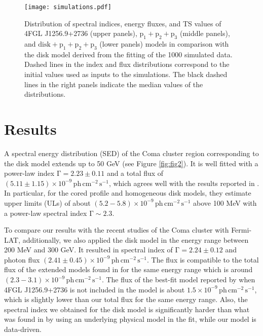 \documentclass[fleqn,usenatbib]{mnras}
\begin{document}
\begin{figure*}
 \centering
\texttt{[image: simulations.pdf]}
\caption{Distribution of spectral indices, energy fluxes, and TS values of 4FGL J1256.9+2736 (upper panels), $\mathrm{p_1+p_2+p_3}$ (middle panels), and $\mathrm{disk+p_1+p_2+p_3}$ (lower panels) models in comparison with the disk model derived from the fitting of the 1000 simulated data. Dashed lines in the index and flux distributions correspond to the initial values used as inputs to the simulations.  The black dashed lines in the right panels indicate the median values of the distributions.}
\label{fig:fig3}
\end{figure*}

\section{Results}

A spectral energy distribution (SED) of the Coma cluster region corresponding to the disk model extends up to 50 GeV (see Figure \ref{fig:fig2}). It is well fitted with a power-law index $\mathrm{\Gamma=2.23\pm0.11}$ and a total flux of $\mathrm{(5.11\pm1.15)\times10^{-9}\,ph\,cm^{-2}\,s^{-1}}$, which agrees well with the results reported in \citet{comaFermiCollab2016ApJ...819..149A}. In particular, for the cored profile and homogeneous disk models, they estimate upper limits (ULs) of about $\mathrm{(5.2-5.8)\times10^{-9}\,ph\,cm^{-2}\,s^{-1}}$ above 100 MeV with a power-law spectral index $\mathrm{\Gamma\sim2.3}$.

To compare our results with the recent studies of the Coma cluster with Fermi-LAT, additionally, we also applied the disk model in the energy range between 200 MeV and 300 GeV. It resulted in spectral index of $\mathrm{\Gamma=2.24\pm0.12}$ and photon flux $\mathrm{(2.41\pm0.45)\times10^{-9}\,ph\,cm^{-2}\,s^{-1}}$. The flux is compatible to the total flux of the extended models found in \citet{fermicoma2018PhRvD..98f3006X} for the same energy range which is around $\mathrm{(2.3-3.1)\times10^{-9}\,ph\,cm^{-2}\,s^{-1}}$. The flux of the best-fit model reported by \citet{2021A&A...648A..60A} when 4FGL J1256.9+2736 is not included in the model is about $\mathrm{1.5\times10^{-9}\,ph\,cm^{-2}\,s^{-1}}$, which is slightly lower than our total flux for the same energy range. Also, the spectral index we obtained for the disk model is significantly harder than what was found in \citet{2021A&A...648A..60A} by using an underlying physical model in the fit, while our model is data-driven.
\end{document}
